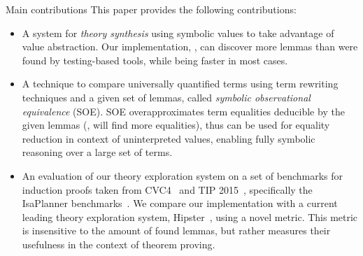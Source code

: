 \medskip
\begin{myparagraph}{Main contributions}
This paper provides the following contributions:
\begin{itemize}[topsep=2pt, leftmargin=1.5em]
    \item A system for \emph{theory synthesis} using symbolic values to take advantage of value abstraction.
    Our implementation, \TheSy, can discover more lemmas than were found by testing-based tools, while being faster in most cases.
    \item A technique to compare universally quantified terms using term rewriting techniques and a given set of lemmas, called \emph{symbolic observational equivalence} (SOE). 
    SOE overapproximates term equalities deducible by the given lemmas (\ie, will find more equalities), thus can be used for equality reduction in context of uninterpreted values, enabling fully symbolic reasoning over a large set of terms.
    \item An evaluation of our theory exploration system on a set of benchmarks for induction proofs taken from CVC4~\cite{cvc4induction} and TIP 2015~\cite{CICM2015:Claessen}, specifically the IsaPlanner benchmarks~\cite{ITP2010:Johansson}.
    We compare our implementation with a current leading theory exploration system, Hipster~\cite{2018AISC:Einarsdottir}, using a novel metric. This metric is insensitive to the amount of found lemmas, but rather measures their usefulness in the context of theorem proving.
\end{itemize}
\end{myparagraph}